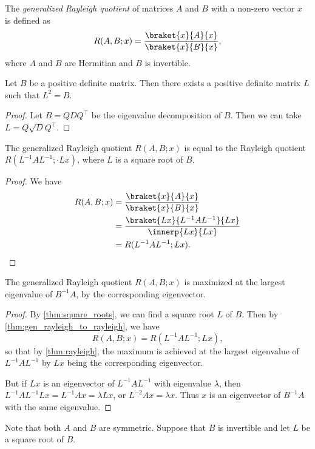 \begin{definition} \label{def:gen_rayleigh}
    The \emph{generalized Rayleigh quotient} of matrices $A$ and $B$ with
    a non-zero vector $x$ is defined as \[
        R(A, B; x) = \frac{\braket{x}{A}{x}}{\braket{x}{B}{x}},
    \] where $A$ and $B$ are Hermitian and $B$ is invertible.
\end{definition}
\begin{lemma} \label{thm:square_roots}
    Let $B$ be a positive definite matrix.
    Then there exists a positive definite matrix $L$ such that $L^2 = B$.
\end{lemma}
\begin{proof}
    Let $B = QDQ^\top$ be the eigenvalue decomposition of $B$.
    Then we can take $L = Q\sqrt{D}Q^\top$.
\end{proof}
\begin{lemma} \label{thm:gen_rayleigh_to_rayleigh}
    The generalized Rayleigh quotient $R(A, B; x)$ is equal to the
    Rayleigh quotient $R(L^{-1}AL^{-1}; \cdot L x)$,
    where $L$ is a square root of $B$.
\end{lemma}
\begin{proof}
    We have \begin{align*}
        R(A, B; x) &= \frac{\braket{x}{A}{x}}{\braket{x}{B}{x}} \\
        &= \frac{\braket{Lx}{L^{-1}AL^{-1}}{Lx}}{\innerp{Lx}{Lx}} \\
        &= R(L^{-1}AL^{-1}; Lx). \qedhere
    \end{align*}
\end{proof}
\begin{theorem} \label{thm:gen_rayleigh}
    The generalized Rayleigh quotient $R(A, B; x)$ is maximized at the
    largest eigenvalue of $B^{-1}A$, by the corresponding eigenvector.
\end{theorem}
\begin{proof}
    By \cref{thm:square_roots}, we can find a square root $L$ of $B$.
    Then by \cref{thm:gen_rayleigh_to_rayleigh}, we have \[
        R(A, B; x) = R(L^{-1}AL^{-1}; Lx),
    \] so that by \cref{thm:rayleigh}, the maximum is achieved at the
    largest eigenvalue of $L^{-1}AL^{-1}$ by $Lx$ being the corresponding
    eigenvector.

    But if $Lx$ is an eigenvector of $L^{-1}AL^{-1}$ with eigenvalue
    $\lambda$, then $L^{-1}AL^{-1}Lx = L^{-1}A x = \lambda Lx$, or
    $L^{-2} A x = \lambda x$.
    Thus $x$ is an eigenvector of $B^{-1}A$ with the same eigenvalue.
\end{proof}
Note that both $A$ and $B$ are symmetric.
Suppose that $B$ is invertible and let $L$ be a square root of $B$.

